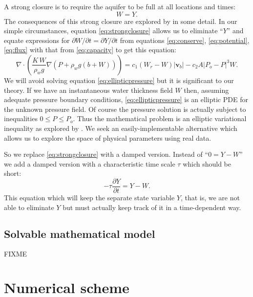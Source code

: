 \documentclass[12pt,final]{amsart}%
\newcommand\bv{\mathbf{v}}
\newcommand{\Div}{\nabla\cdot}
\newcommand{\grad}{\nabla}
\begin{document}
A strong closure is to require the aquifer to be full at all locations and times:
\begin{equation}
W = Y.\label{eq:strongclosure}
\end{equation}
The consequences of this strong closure are explored by \cite{Schoofetal2012} in some detail.  In our simple circumstances, equation \eqref{eq:strongclosure} allows us to eliminate ``$Y$'' and equate expressions for $\partial W/\partial t = \partial Y/\partial t$ from equations \eqref{eq:conserve}, \eqref{eq:potential}, \eqref{eq:flux} with that from \eqref{eq:capacity} to get this equation:
\begin{equation}
\Div \left(\frac{K\,W}{\rho_w g} \grad \left(P + \rho_w g (b+W)\right) \right) = c_1 \left(W_r - W\right) |\bv_b| - c_2 A |P_o - P|^3 W.\label{eq:ellipticpressure}
\end{equation}
We will avoid solving equation \eqref{eq:ellipticpressure} but it is significant to our theory.  If we have an instantaneous water thickness field $W$ then, assuming adequate pressure boundary conditions, \eqref{eq:ellipticpressure} is an elliptic PDE for the unknown pressure field.  Of course the pressure solution is actually subject to inequalities $0 \le P \le P_o$.  Thus the mathematical problem is an elliptic variational inequality as explored by \cite{Schoofetal2012}.  We seek an easily-implementable alternative which allows us to explore the space of physical parameters using real data.

So we replace \eqref{eq:strongclosure} with a damped version.  Instead of ``$0 = Y - W$'' we add a damped version with a characteristic time scale $\tau$ which should be short:
\begin{equation}
- \tau \frac{\partial Y}{\partial t} = Y - W. \label{eq:dampedclosure}
\end{equation}
This equation which will keep the separate state variable $Y$, that is, we are not able to eliminate $Y$ but must actually keep track of it in a time-dependent way.



\subsection*{Solvable mathematical model}  FIXME



\section{Numerical scheme}
\end{document}

